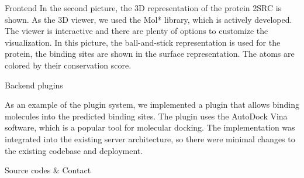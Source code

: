 \documentclass[portrait,a0paper,fontscale=0.25]{baposter}
\begin{document}
\begin{poster}
\begin{posterbox}[column=1, name=result1]{Frontend}
In the second picture, the 3D representation of the protein 2SRC is shown.
As the 3D viewer, we used the Mol* library, which is actively developed.
The viewer is interactive and there are plenty of options to customize the visualization.
In this picture, the ball-and-stick representation is used for the protein, the binding sites are shown in the surface representation.
The atoms are colored by their conservation score.

\end{posterbox}

\begin{posterbox}[column=1, name=result2, below=result1]{Backend plugins}

As an example of the plugin system, we implemented a plugin that allows binding molecules into the predicted binding sites.
The plugin uses the AutoDock Vina software, which is a popular tool for molecular docking.
The implementation was integrated into the existing server architecture, so there were minimal changes to the existing codebase and deployment.

\end{posterbox}


\begin{posterbox}[column=1, name=conclusion, below=result2, bottomaligned=tech]{Source codes \& Contact}


\end{posterbox}
\end{poster}
\end{document}

